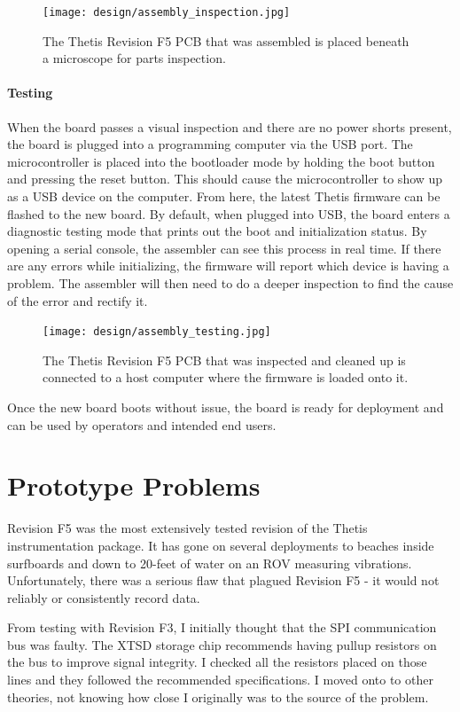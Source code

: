 \begin{figure}[h!]
	\centering
	\texttt{[image: design/assembly\_inspection.jpg]}
	\caption{The Thetis Revision F5 PCB that was assembled is placed beneath a microscope for parts inspection.}
\end{figure}

\paragraph*{Testing} When the board passes a visual inspection and there are no power shorts present, the board is plugged into a programming computer via the USB port.
The microcontroller is placed into the bootloader mode by holding the boot button and pressing the reset button.
This should cause the microcontroller to show up as a USB device on the computer.
From here, the latest Thetis firmware can be flashed to the new board.
By default, when plugged into USB, the board enters a diagnostic testing mode that prints out the boot and initialization status.
By opening a serial console, the assembler can see this process in real time.
If there are any errors while initializing, the firmware will report which device is having a problem.
The assembler will then need to do a deeper inspection to find the cause of the error and rectify it.

\begin{figure}[h!]
	\centering
	\texttt{[image: design/assembly\_testing.jpg]}
	\caption{The Thetis Revision F5 PCB that was inspected and cleaned up is connected to a host computer where the firmware is loaded onto it.}
\end{figure}

Once the new board boots without issue, the board is ready for deployment and can be used by operators and intended end users.

\section{Prototype Problems} 
Revision F5 was the most extensively tested revision of the Thetis instrumentation package.
It has gone on several deployments to beaches inside surfboards and down to 20-feet of water on an ROV measuring vibrations.
Unfortunately, there was a serious flaw that plagued Revision F5 - it would not reliably or consistently record data.

From testing with Revision F3, I initially thought that the SPI communication bus was faulty.
The XTSD storage chip recommends having pullup resistors on the bus to improve signal integrity.
I checked all the resistors placed on those lines and they followed the recommended specifications.
I moved onto to other theories, not knowing how close I originally was to the source of the problem.

